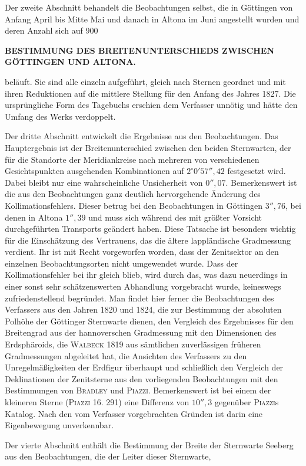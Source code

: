 Der zweite Abschnitt behandelt die Beobachtungen selbst, die in Göttingen
von Anfang April bis Mitte Mai und danach in Altona im Juni angestellt wurden
und deren Anzahl sich auf 900
\par

\par\clearpage
\noindent\makebox[12mm][l]{}\parbox[t]{\dimexpr\linewidth-24mm\relax}{\centering\scriptsize\bfseries BESTIMMUNG DES BREITENUNTERSCHIEDS ZWISCHEN GÖTTINGEN UND ALTONA.}\par\medskip

\noindent beläuft. Sie sind alle einzeln aufgeführt, gleich nach Sternen
geordnet und mit ihren Reduktionen auf die mittlere Stellung für den Anfang des
Jahres 1827. Die ursprüngliche Form des Tagebuchs erschien dem Verfasser
unnötig und hätte den Umfang des Werks verdoppelt.

Der dritte Abschnitt entwickelt die Ergebnisse aus den Beobachtungen. Das
Hauptergebnis ist der Breitenunterschied zwischen den beiden Sternwarten, der
für die Standorte der Meridiankreise nach mehreren von verschiedenen
Gesichtspunkten ausgehenden Kombinationen auf \(2^\circ0'57''{,}42\) festgesetzt
wird. Dabei bleibt nur eine wahrscheinliche Unsicherheit von \(0''{,}07\).
Bemerkenswert ist die aus den Beobachtungen ganz deutlich hervorgehende
Änderung des Kollimationsfehlers. Dieser betrug bei den Beobachtungen in
Göttingen \(3''{,}76\), bei denen in Altona \(1''{,}39\) und muss sich während
des mit größter Vorsicht durchgeführten Transports geändert haben. Diese
Tatsache ist besonders wichtig für die Einschätzung des Vertrauens, das die
ältere lappländische Gradmessung verdient. Ihr ist mit Recht vorgeworfen
worden, dass der Zenitsektor an den einzelnen Beobachtungsorten nicht
umgewendet wurde. Dass der Kollimationsfehler bei ihr gleich blieb, wird durch
das, was dazu neuerdings in einer sonst sehr schätzenswerten Abhandlung
vorgebracht wurde, keineswegs zufriedenstellend begründet. Man findet hier
ferner die Beobachtungen des Verfassers aus den Jahren 1820 und 1824, die zur
Bestimmung der absoluten Polhöhe der Göttinger Sternwarte dienen, den Vergleich
des Ergebnisses für den Breitengrad aus der hannoverschen Gradmessung mit
den Dimensionen des Erdsphäroids, die \textsc{Walbeck} 1819 aus sämtlichen
zuverlässigen früheren Gradmessungen abgeleitet hat, die Ansichten des
Verfassers zu den Unregelmäßigkeiten der Erdfigur überhaupt und schließlich
den Vergleich der Deklinationen der Zenitsterne aus den vorliegenden
Beobachtungen mit den Bestimmungen von \textsc{Bradley} und \textsc{Piazzi}.
Bemerkenswert ist bei einem der kleineren Sterne (\textsc{Piazzi} 16. 291)
eine Differenz von \(10''{,}3\) gegenüber \textsc{Piazzi}s Katalog. Nach den vom
Verfasser vorgebrachten Gründen ist darin eine Eigenbewegung unverkennbar.

Der vierte Abschnitt enthält die Bestimmung der Breite der Sternwarte
Seeberg aus den Beobachtungen, die der Leiter dieser Sternwarte,
\par
\par
\endgroup
